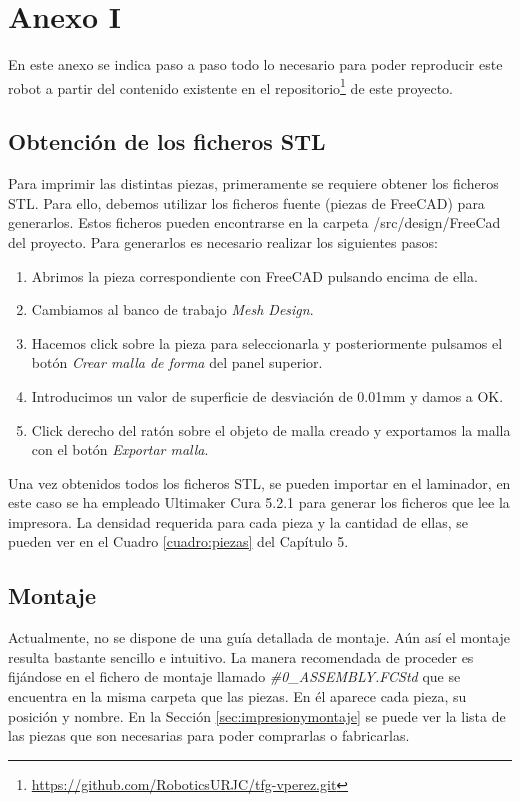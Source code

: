\chapter*{Anexo I}
\label{cap:anexoi}

\noindent En este anexo se indica paso a paso todo lo necesario para poder reproducir este robot a partir del contenido 
existente en el repositorio\footnote{\url{https://github.com/RoboticsURJC/tfg-vperez.git}} de este proyecto.

\section*{Obtención de los ficheros STL}
\noindent Para imprimir las distintas piezas, primeramente se requiere obtener los ficheros STL. Para ello, 
debemos utilizar los ficheros fuente (piezas de FreeCAD) para generarlos. Estos ficheros pueden 
encontrarse en la carpeta /src/design/FreeCad del proyecto. Para generarlos es necesario realizar los siguientes pasos:
\begin{enumerate}
\item Abrimos la pieza correspondiente con FreeCAD pulsando encima de ella.
\item Cambiamos al banco de trabajo \textit{Mesh Design}.
\item Hacemos click sobre la pieza para seleccionarla y posteriormente pulsamos el botón \textit{Crear malla de forma} del panel superior.
\item Introducimos un valor de superficie de desviación de 0.01mm y damos a OK.
\item Click derecho del ratón sobre el objeto de malla creado y exportamos la malla con el botón \textit{Exportar malla}. 
    
\end{enumerate}

Una vez obtenidos todos los ficheros STL, se pueden importar en el laminador, en este caso se ha empleado 
Ultimaker Cura 5.2.1 para generar los ficheros que lee la impresora. La densidad requerida para cada pieza 
y la cantidad de ellas, se pueden ver en el Cuadro \ref{cuadro:piezas} del Capítulo 5.

\newpage
\section*{Montaje}
\noindent Actualmente, no se dispone de una guía detallada de montaje. Aún así el montaje resulta bastante sencillo 
e intuitivo. La manera recomendada de proceder es fijándose en el fichero de 
montaje llamado \textit{\#0\_ASSEMBLY.FCStd} que se encuentra en la misma carpeta que las piezas. En él 
aparece cada pieza, su posición y nombre. En la Sección \ref{sec:impresionymontaje} se puede ver la lista de las piezas que 
son necesarias para poder comprarlas o fabricarlas.

